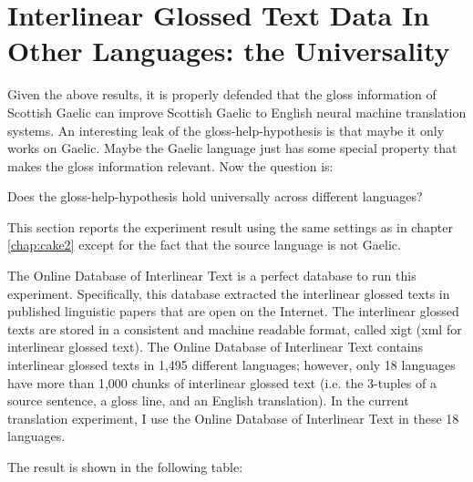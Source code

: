 \documentclass[final]{ua-thesis}
\numberwithin{equation}{section}
\begin{document}
\section{Interlinear Glossed Text Data In Other Languages: the Universality}
Given the above results, it is properly defended that the gloss information of Scottish Gaelic can improve Scottish Gaelic to English neural machine translation systems. An interesting leak of the gloss-help-hypothesis is that maybe it only works on Gaelic. Maybe the Gaelic language just has some special property that makes the gloss information relevant. Now the question is:

\begin{exe}
\ex Does the gloss-help-hypothesis hold universally across different languages?   
\end{exe}  

This section reports the experiment result using the same settings as in chapter \ref{chap:cake2} except for the fact that the source language is not Gaelic. 

The Online Database of Interlinear Text \citep{ODIN, Xia2016} is a perfect database to run this experiment. Specifically, this database extracted the interlinear glossed texts in published linguistic papers that are open on the Internet. The interlinear glossed texts are stored in a consistent and machine readable format, called xigt (xml for interlinear glossed text). The Online Database of Interlinear Text contains interlinear glossed texts in 1,495 different languages; however, only 18 languages have more than 1,000 chunks of interlinear glossed text (i.e. the 3-tuples of a source sentence, a gloss line, and an English translation). In the current translation experiment, I use the Online Database of Interlinear Text in these 18 languages.   

The result is shown in the following table:   
\end{document}
